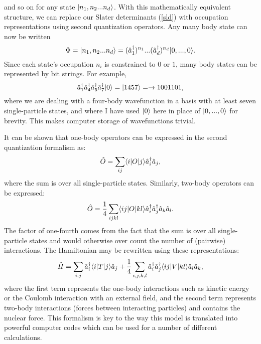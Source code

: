 and so on for any state $|n_1,n_2...n_d\rangle$. With this mathematically equivalent 
structure, we can replace our Slater determinants (\ref{sld}) with occupation 
representations using second quantization operators. Any many body state can
now be written
\begin{equation}\label{sld2}
    \Phi = |n_1,n_2...n_d\rangle = (\hat{a}^\dagger_1)^{n_1}...(\hat{a}^\dagger_d)^{n_d}|0,...,0\rangle.
\end{equation}
Since each state's occupation $n_i$ is
constrained to $0$ or $1$, many body states can be represented by bit strings. 
For example\cite{Johnson18},
\begin{equation}
    \hat{a}^\dagger_1\hat{a}^\dagger_4\hat{a}^\dagger_5\hat{a}^\dagger_7|0\rangle = |1457\rangle = \to
    1001101,
\end{equation}
where we are dealing with a four-body wavefunction in a basis with at least
seven single-particle states, and where I have used $|0\rangle$ here in place of $|0,...,0\rangle$
for brevity. This makes computer storage of wavefunctions trivial.
 
It can be shown that one-body operators can be expressed in the second quantization
formalism as\cite{Brussard}:
\begin{equation}
    \hat{O}=\sum_{ij}\langle i|O|j\rangle\hat{a}^\dagger_i\hat{a}_j,
\end{equation}
where the sum is over all single-particle states. Similarly, two-body operators 
can be expressed\cite{Brussard}:
\begin{equation}
    \hat{O}=\frac{1}{4}\sum_{ijkl}\langle ij|O|kl\rangle\hat{a}^\dagger_i\hat{a}^\dagger_j\hat{a}_k\hat{a}_l.
\end{equation}
The factor of one-fourth comes from the fact that the sum is over all single-particle 
states and would otherwise over count the number of (pairwise) interactions.
The Hamiltonian may be rewritten using these representations:
\begin{equation}\label{nuchamil}
	\hat{H}=\sum_{i,j}\hat{a}^\dagger_i\langle i|T|j\rangle\hat{a}_j
    +\frac{1}{4}\sum_{i,j,k,l}\hat{a}^\dagger_i\hat{a}^\dagger_j\langle ij|V|kl\rangle\hat{a}_l\hat{a}_k,
\end{equation}
where the first term represents the one-body interactions such as kinetic energy or the Coulomb 
interaction with an external field, and the second term represents two-body interactions 
(forces between interacting particles) and contains the nuclear force. This formalism is key to 
the way this model is translated into powerful computer codes which can be used for a number 
of different calculations. 

